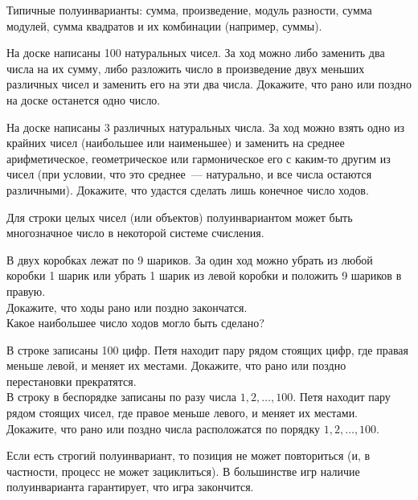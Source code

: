 Типичные полуинварианты: сумма, произведение, модуль разности, сумма модулей,
сумма квадратов и их комбинации (например, суммы).

\begin{problems}

\item
На доске написаны 100 натуральных чисел.
За ход можно либо заменить два числа на их сумму, либо разложить число
в произведение двух меньших различных чисел и заменить его на эти два числа.
Докажите, что рано или поздно на доске останется одно число.

\item
На доске написаны 3 различных натуральных числа.
За ход можно взять одно из крайних чисел (наибольшее или наименьшее) и заменить
на среднее арифметическое, геометрическое или гармоническое его с каким-то
другим из чисел (при условии, что это среднее~--- натурально, и все числа
остаются различными).
Докажите, что удастся сделать лишь конечное число ходов.

\end{problems}

Для строки целых чисел (или объектов) полуинвариантом может быть многозначное
число в некоторой системе счисления.

\begin{problems}

\item
В двух коробках лежат по 9 шариков.
За один ход можно убрать из любой коробки 1 шарик или убрать 1 шарик из левой
коробки и положить 9 шариков в правую.
\\
\sp Докажите, что ходы рано или поздно закончатся.
\\
\sp Какое наибольшее число ходов могло быть сделано?

\item
\sp
В строке записаны 100 цифр.
Петя находит пару рядом стоящих цифр, где правая меньше левой, и меняет
их местами.
Докажите, что рано или поздно перестановки прекратятся.
\\
\sp
В строку в беспорядке записаны по разу числа $1, 2, \ldots, 100$.
Петя находит пару рядом стоящих чисел, где правое меньше левого, и меняет
их местами.
Докажите, что рано или поздно числа расположатся по порядку
$1, 2, \ldots, 100$.

\end{problems}

Если есть строгий полуинвариант, то позиция не может повториться
(и, в частности, процесс не может зациклиться).
В большинстве игр наличие полуинварианта гарантирует, что игра закончится.

